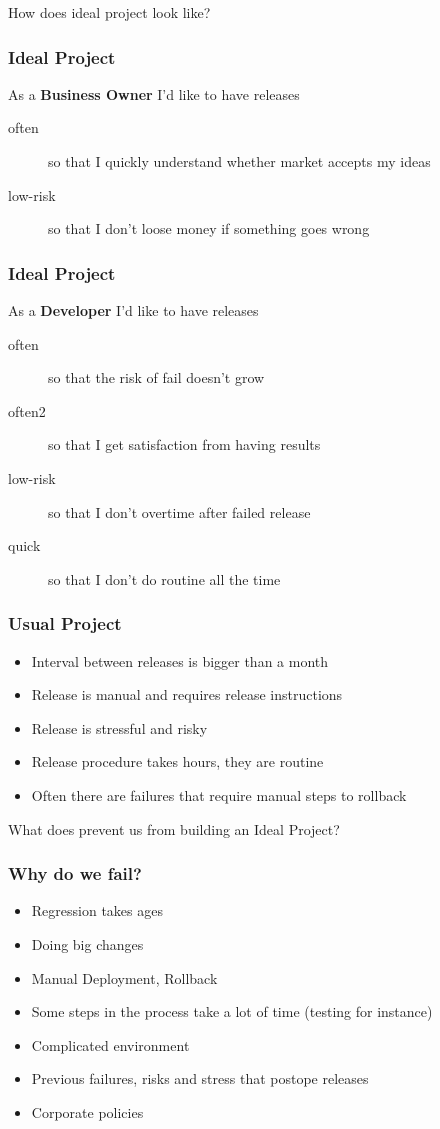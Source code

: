 \documentclass{beamer}
\begin{document}
\begin{frame}
How does ideal project look like?
\end{frame}
\begin{frame}
  \frametitle{Ideal Project}
  As a \textbf{Business Owner} I'd like to have releases
  \begin{description}
   \item[often] so that I quickly understand whether market accepts my ideas 
   \item[low-risk] so that I don't loose money if something goes wrong
  \end{description}
\end{frame}
\begin{frame}
  \frametitle{Ideal Project}
  As a \textbf{Developer} I'd like to have releases
  \begin{description}
   \item[often] so that the risk of fail doesn't grow
   \item[often2] so that I get satisfaction from having results
   \item[low-risk] so that I don't overtime after failed release
   \item[quick] so that I don't do routine all the time
  \end{description}
\end{frame}
\begin{frame}
 \frametitle{Usual Project}
 \begin{itemize}
   \item Interval between releases is bigger than a month
   \item Release is manual and requires release instructions
   \item Release is stressful and risky
   \item Release procedure takes hours, they are routine
   \item Often there are failures that require manual steps to rollback
 \end{itemize}
\end{frame}
\begin{frame}
  What does prevent us from building an Ideal Project?
\end{frame}
\begin{frame}
  \frametitle{Why do we fail?}
  \begin{itemize}
    \item Regression takes ages
    \item Doing big changes
    \item Manual Deployment, Rollback
    \item Some steps in the process take a lot of time (testing for instance)
    \item Complicated environment
    \item Previous failures, risks and stress that postope releases
    \item Corporate policies
  \end{itemize}
\end{frame}
\end{document}
